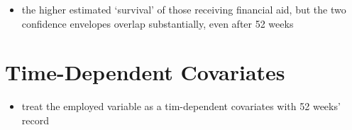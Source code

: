 \documentclass[]{book}
\providecommand{\tightlist}{%
  \setlength{\itemsep}{0pt}\setlength{\parskip}{0pt}}
\begin{document}
\begin{itemize}
\tightlist
\item
  the higher estimated `survival' of those receiving financial aid, but the two confidence envelopes overlap substantially, even after 52 weeks
\end{itemize}

\hypertarget{time-dependent-covariates}{%
\section{Time-Dependent Covariates}\label{time-dependent-covariates}}

\begin{itemize}
\tightlist
\item
  treat the employed variable as a tim-dependent covariates with 52 weeks' record
\end{itemize}
\end{document}
